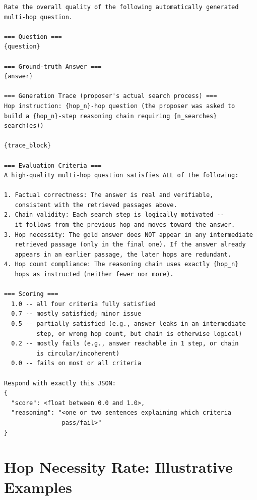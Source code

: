 \documentclass{article}
\begin{document}
\begin{tcolorbox}[judgebox, title={LLM Judge User Prompt}, breakable]
\small
\begin{verbatim}
Rate the overall quality of the following automatically generated
multi-hop question.

=== Question ===
{question}

=== Ground-truth Answer ===
{answer}

=== Generation Trace (proposer's actual search process) ===
Hop instruction: {hop_n}-hop question (the proposer was asked to
build a {hop_n}-step reasoning chain requiring {n_searches} search(es))

{trace_block}

=== Evaluation Criteria ===
A high-quality multi-hop question satisfies ALL of the following:

1. Factual correctness: The answer is real and verifiable,
   consistent with the retrieved passages above.
2. Chain validity: Each search step is logically motivated --
   it follows from the previous hop and moves toward the answer.
3. Hop necessity: The gold answer does NOT appear in any intermediate
   retrieved passage (only in the final one). If the answer already
   appears in an earlier passage, the later hops are redundant.
4. Hop count compliance: The reasoning chain uses exactly {hop_n}
   hops as instructed (neither fewer nor more).

=== Scoring ===
  1.0 -- all four criteria fully satisfied
  0.7 -- mostly satisfied; minor issue
  0.5 -- partially satisfied (e.g., answer leaks in an intermediate
         step, or wrong hop count, but chain is otherwise logical)
  0.2 -- mostly fails (e.g., answer reachable in 1 step, or chain
         is circular/incoherent)
  0.0 -- fails on most or all criteria

Respond with exactly this JSON:
{
  "score": <float between 0.0 and 1.0>,
  "reasoning": "<one or two sentences explaining which criteria
                pass/fail>"
}
\end{verbatim}
\end{tcolorbox}

\section{Hop Necessity Rate: Illustrative Examples}
\label{app:hnr_examples}
\end{document}
